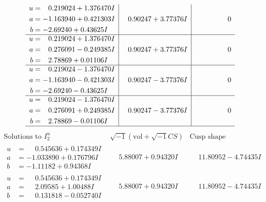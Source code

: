 \documentclass[1p]{elsarticle_modified}
\theoremstyle{definition}
\newcommand{\I}{\sqrt{-1}}
\begin{document}
$$\begin{array}{c|c|c}
\begin{aligned}
u &= \phantom{-}0.219024 + 1.376470 I \\
a &= -1.163940 + 0.421303 I \\
b &= -2.69240 + 0.43625 I\end{aligned}
 & \phantom{-}0.90247 + 3.77376 I & \phantom{-0.000000 } 0 \\ \hline\begin{aligned}
u &= \phantom{-}0.219024 + 1.376470 I \\
a &= \phantom{-}0.276091 - 0.249385 I \\
b &= \phantom{-}2.78869 + 0.01106 I\end{aligned}
 & \phantom{-}0.90247 + 3.77376 I & \phantom{-0.000000 } 0 \\ \hline\begin{aligned}
u &= \phantom{-}0.219024 - 1.376470 I \\
a &= -1.163940 - 0.421303 I \\
b &= -2.69240 - 0.43625 I\end{aligned}
 & \phantom{-}0.90247 - 3.77376 I & \phantom{-0.000000 } 0 \\ \hline\begin{aligned}
u &= \phantom{-}0.219024 - 1.376470 I \\
a &= \phantom{-}0.276091 + 0.249385 I \\
b &= \phantom{-}2.78869 - 0.01106 I\end{aligned}
 & \phantom{-}0.90247 - 3.77376 I & \phantom{-0.000000 } 0\\
 \hline 
 \end{array}$$\newpage$$\begin{array}{c|c|c}  
\text{Solutions to }I^u_{2}& \I (\text{vol} + \sqrt{-1}CS) & \text{Cusp shape}\\
 \hline 
\begin{aligned}
u &= \phantom{-}0.545636 + 0.174349 I \\
a &= -1.033890 + 0.176796 I \\
b &= -1.11182 + 0.94368 I\end{aligned}
 & \phantom{-}5.88007 + 0.94320 I & \phantom{-}11.80952 - 4.74435 I \\ \hline\begin{aligned}
u &= \phantom{-}0.545636 + 0.174349 I \\
a &= \phantom{-}2.09585 + 1.00488 I \\
b &= \phantom{-}0.131818 - 0.052740 I\end{aligned}
 & \phantom{-}5.88007 + 0.94320 I & \phantom{-}11.80952 - 4.74435 I \\ \hline\begin{aligned}

\end{aligned}
\end{array}$$
\end{document}
